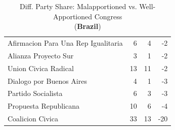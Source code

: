 \documentclass[a4paper,12pt]{article}
\begin{document}
\begin{landscape}
\begin{table}[!htb]
{{\begin{tabular}{lrrr}
  Afirmacion Para Una Rep Igualitaria & 6 & 4 & -2 \\ 
  Alianza Proyecto Sur & 3 & 1 & -2 \\ 
  Union Civica Radical & 13 & 11 & -2 \\ 
  Dialogo por Buenos Aires & 4 & 1 & -3 \\ 
  Partido Socialista & 6 & 3 & -3 \\ 
  Propuesta Republicana & 10 & 6 & -4 \\ 
  Coalicion Civica & 33 & 13 & -20 \\ 
   \hline \hline
\end{tabular}
}}
\hspace{.5cm}
\parbox{.3\linewidth}{
\centering
\caption{Diff. Party Share: Malapportioned vs. Well-Apportioned Congress \\ (\textbf{Brazil})}
\label{tab:bra_party}
}

\end{table}
\end{landscape}
\end{document}
